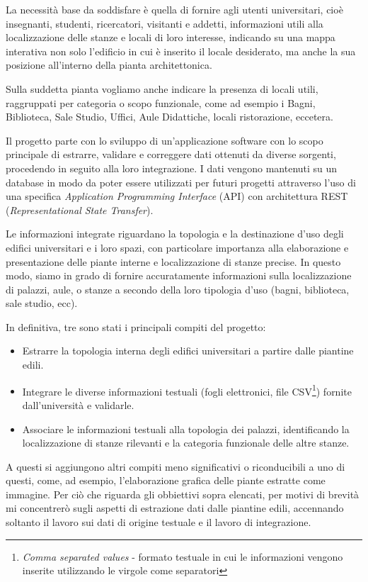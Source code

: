 \documentclass[12pt]{report}
\begin{document}
La necessità base da soddisfare è quella di fornire agli utenti
universitari, cioè insegnanti, studenti, ricercatori, visitanti
e addetti, informazioni utili alla localizzazione delle stanze 
e locali di loro interesse, indicando su una mappa interativa
non solo l'edificio in cui è inserito il locale desiderato, ma anche 
la sua posizione all'interno della pianta architettonica. 

Sulla suddetta pianta vogliamo anche indicare la presenza di locali
utili, raggruppati per categoria o scopo funzionale, come ad esempio
i Bagni, Biblioteca, Sale Studio, Uffici, Aule Didattiche, locali
ristorazione, eccetera.

Il progetto parte con lo sviluppo di un'applicazione software con 
lo scopo principale di estrarre, validare e correggere dati 
ottenuti da diverse sorgenti, procedendo in seguito alla loro integrazione.
I dati vengono mantenuti su un database in modo da poter essere 
utilizzati per futuri progetti attraverso l'uso di una specifica 
\textit{Application Programming Interface} (API) con architettura REST 
(\textit{Representational State Transfer}). 

Le informazioni integrate riguardano la topologia e la destinazione
d'uso degli edifici universitari e i loro spazi, con particolare
importanza alla elaborazione e presentazione delle piante interne e
localizzazione di stanze precise. In questo modo, siamo in grado di
fornire accuratamente informazioni sulla localizzazione di palazzi,
aule, o stanze a secondo della loro tipologia d'uso (bagni, 
biblioteca, sale studio, ecc).

In definitiva, tre sono stati i principali compiti del progetto:
\begin{itemize}
  \item Estrarre la topologia interna degli edifici universitari a
partire dalle piantine edili.
  \item Integrare le diverse informazioni testuali (fogli elettronici,
file CSV\footnote{\textit{Comma separated values} - formato testuale
in cui le informazioni vengono inserite utilizzando le virgole come
separatori}) fornite dall'università e validarle.
  \item Associare le informazioni testuali alla topologia dei palazzi,
identificando la localizzazione di stanze rilevanti e la categoria
funzionale delle altre stanze.
\end{itemize}

A questi si aggiungono altri compiti meno significativi o riconducibili a uno
di questi, come, ad esempio, l'elaborazione grafica delle piante estratte
come immagine. Per ciò che riguarda gli obbiettivi sopra elencati, per 
motivi di brevità mi concentrerò sugli aspetti di estrazione dati
dalle piantine edili, accennando soltanto il lavoro sui dati di origine
testuale e il lavoro di integrazione.
\end{document}
